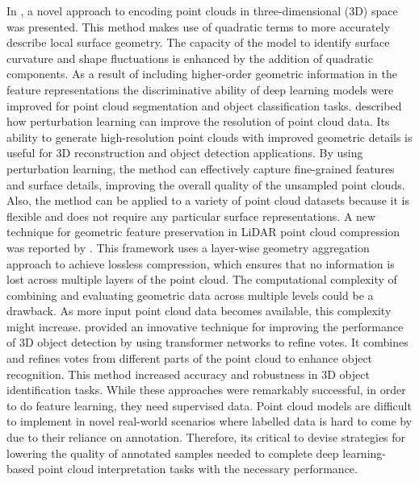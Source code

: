 In \cite{sun2021quadratic}, a novel approach to encoding point clouds in three-dimensional (3D) space was presented. This method makes use of quadratic terms to more accurately describe local surface geometry. The capacity of the model to identify surface curvature and shape fluctuations is enhanced by the addition of quadratic components. As a result of including higher-order geometric information in the feature representations the discriminative ability of deep learning models were improved for point cloud segmentation and object classification tasks.  \cite{ding2021point} described how perturbation learning can improve the resolution of point cloud data. Its ability to generate high-resolution point clouds with improved geometric details is useful for 3D reconstruction and object detection applications. By using perturbation learning, the method can effectively capture fine-grained features and surface details, improving the overall quality of the unsampled point clouds. Also, the method can be applied to a variety of point cloud datasets because it is flexible and does not require any particular surface representations.  A new technique for geometric feature preservation in \ac{LiDAR} point cloud compression was reported by \cite{song2021layer}. This framework uses a layer-wise geometry aggregation approach to achieve lossless compression, which ensures that no information is lost across multiple layers of the point cloud.  The computational complexity of combining and evaluating geometric data across multiple levels could be a drawback. As more input point cloud data becomes available, this complexity might increase. \cite{zhao2021transformer3d} provided an innovative technique for improving the performance of 3D object detection by using transformer networks to refine votes. It combines and refines votes from different parts of the point cloud to enhance object recognition. This method increased accuracy and robustness in 3D object identification tasks. While these approaches were remarkably successful, in order to do feature learning, they need supervised data. Point cloud models are difficult to implement in novel real-world scenarios where labelled data is hard to come by due to their reliance on annotation. Therefore, its critical to devise strategies for lowering the quality of annotated samples needed to complete deep learning-based point cloud interpretation tasks with the necessary performance\cite{mei2022unsupervised}.
\cleardoublepage